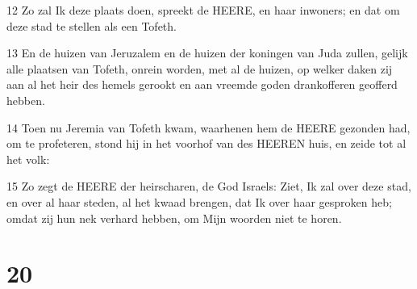 \par 12 Zo zal Ik deze plaats doen, spreekt de HEERE, en haar inwoners; en dat om deze stad te stellen als een Tofeth.
\par 13 En de huizen van Jeruzalem en de huizen der koningen van Juda zullen, gelijk alle plaatsen van Tofeth, onrein worden, met al de huizen, op welker daken zij aan al het heir des hemels gerookt en aan vreemde goden drankofferen geofferd hebben.
\par 14 Toen nu Jeremia van Tofeth kwam, waarhenen hem de HEERE gezonden had, om te profeteren, stond hij in het voorhof van des HEEREN huis, en zeide tot al het volk:
\par 15 Zo zegt de HEERE der heirscharen, de God Israels: Ziet, Ik zal over deze stad, en over al haar steden, al het kwaad brengen, dat Ik over haar gesproken heb; omdat zij hun nek verhard hebben, om Mijn woorden niet te horen.

\chapter{20}

